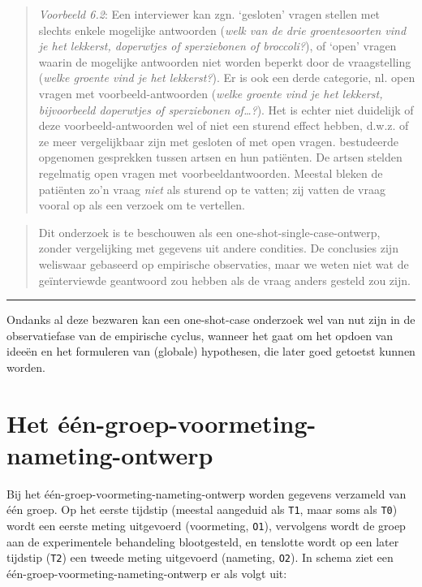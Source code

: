 \documentclass[
]{book}
\begin{document}
\begin{quote}
\emph{Voorbeeld 6.2}: Een interviewer kan zgn. `gesloten' vragen stellen met slechts enkele
mogelijke antwoorden (\emph{welk van de drie groentesoorten vind je het
lekkerst, doperwtjes of sperziebonen of broccoli?}), of `open' vragen
waarin de mogelijke antwoorden niet worden beperkt door de vraagstelling
(\emph{welke groente vind je het lekkerst?}). Er is ook een derde categorie,
nl. open vragen met voorbeeld-antwoorden (\emph{welke groente vind je het
lekkerst, bijvoorbeeld doperwtjes of sperziebonen of\ldots?}). Het is
echter niet duidelijk of deze voorbeeld-antwoorden wel of niet een
sturend effect hebben, d.w.z. of ze meer vergelijkbaar zijn met gesloten
of met open vragen. \citep{Houtk91} bestudeerde opgenomen gesprekken tussen
artsen en hun patiënten. De artsen stelden regelmatig open vragen met
voorbeeldantwoorden. Meestal bleken de patiënten zo'n vraag \emph{niet} als
sturend op te vatten; zij vatten de vraag vooral op als een verzoek om
te vertellen.
\end{quote}

\begin{quote}
Dit onderzoek is te beschouwen als een one-shot-single-case-ontwerp,
zonder vergelijking met gegevens uit andere condities. De conclusies
zijn weliswaar gebaseerd op empirische observaties, maar we weten niet
wat de geïnterviewde geantwoord zou hebben als de vraag anders gesteld
zou zijn.
\end{quote}

\begin{center}\rule{0.5\linewidth}{0.5pt}\end{center}

Ondanks al deze bezwaren kan een one-shot-case onderzoek wel van nut
zijn in de observatiefase van de empirische cyclus, wanneer het gaat om
het opdoen van ideeën en het formuleren van (globale) hypothesen, die
later goed getoetst kunnen worden.

\section{Het één-groep-voormeting-nameting-ontwerp}\label{sec:eengroepvoorna}

Bij het één-groep-voormeting-nameting-ontwerp worden gegevens verzameld
van één groep. Op het eerste tijdstip (meestal aangeduid als \texttt{T1}, maar
soms als \texttt{T0}) wordt een eerste meting uitgevoerd (voormeting, \texttt{O1}),
vervolgens wordt de groep aan de experimentele behandeling blootgesteld,
en tenslotte wordt op een later tijdstip (\texttt{T2}) een tweede meting
uitgevoerd (nameting, \texttt{O2}). In schema ziet een
één-groep-voormeting-nameting-ontwerp er als volgt uit:
\end{document}
